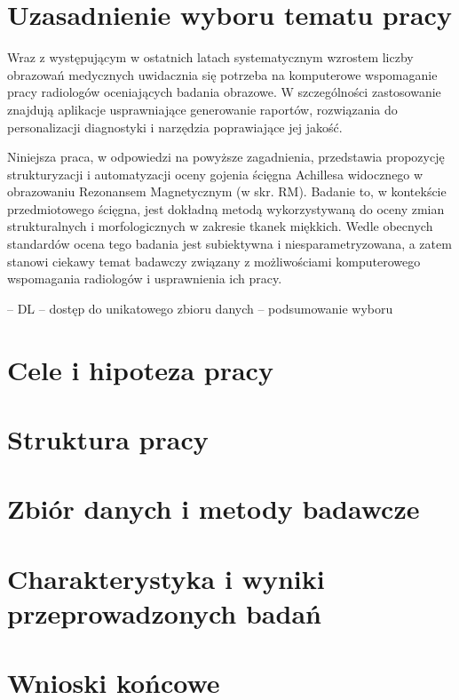 \chapter{Uzasadnienie wyboru tematu pracy}
Wraz z występującym w ostatnich latach systematycznym wzrostem liczby obrazowań medycznych uwidacznia się potrzeba na komputerowe wspomaganie pracy radiologów oceniających badania obrazowe. W szczególności zastosowanie znajdują aplikacje usprawniające generowanie raportów, rozwiązania do personalizacji diagnostyki i narzędzia poprawiające jej jakość.

Niniejsza praca, w odpowiedzi na powyższe zagadnienia, przedstawia propozycję strukturyzacji i automatyzacji oceny gojenia ścięgna Achillesa widocznego w obrazowaniu Rezonansem Magnetycznym (w skr. RM). Badanie to, w kontekście przedmiotowego ścięgna, jest dokładną metodą wykorzystywaną do oceny zmian strukturalnych i morfologicznych w zakresie tkanek miękkich. Wedle obecnych standardów ocena tego badania jest subiektywna i niesparametryzowana, a zatem stanowi ciekawy temat badawczy związany z możliwościami komputerowego wspomagania radiologów i usprawnienia ich pracy.

-- DL
-- dostęp do unikatowego zbioru danych
-- podsumowanie wyboru
 

\chapter{Cele i hipoteza pracy}
\chapter{Struktura pracy}
\chapter{Zbiór danych i metody badawcze}
\chapter{Charakterystyka i wyniki przeprowadzonych badań}
\chapter{Wnioski końcowe}